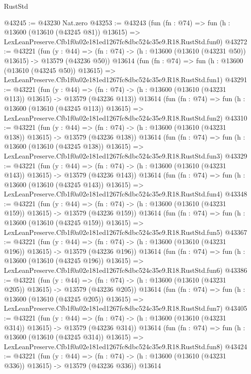 \begin{lexlean}{RustStd}
\begin{coremodule}
@43245 := @43230 Nat.zero
@43253 := @43243
    (fun (fn : @74) =>
    fun (h : @13600 (@13610 (@43245 @81)) @13615) =>
    LexLeanPreserve.Cfb1f0a02e181ed1267fc8dbc524c35e9.R18.RustStd.fun0)
@43272 := @43221
    (fun (y : @44) =>
    (fn : @74) -> (h : @13600 (@13610 (@43231 @50)) @13615) -> @13579 (@43236 @50))
    @13614
    (fun (fn : @74) =>
    fun (h : @13600 (@13610 (@43245 @50)) @13615) =>
    LexLeanPreserve.Cfb1f0a02e181ed1267fc8dbc524c35e9.R18.RustStd.fun1)
@43291 := @43221
    (fun (y : @44) =>
    (fn : @74) -> (h : @13600 (@13610 (@43231 @113)) @13615) -> @13579 (@43236 @113))
    @13614
    (fun (fn : @74) =>
    fun (h : @13600 (@13610 (@43245 @113)) @13615) =>
    LexLeanPreserve.Cfb1f0a02e181ed1267fc8dbc524c35e9.R18.RustStd.fun2)
@43310 := @43221
    (fun (y : @44) =>
    (fn : @74) -> (h : @13600 (@13610 (@43231 @138)) @13615) -> @13579 (@43236 @138))
    @13614
    (fun (fn : @74) =>
    fun (h : @13600 (@13610 (@43245 @138)) @13615) =>
    LexLeanPreserve.Cfb1f0a02e181ed1267fc8dbc524c35e9.R18.RustStd.fun3)
@43329 := @43221
    (fun (y : @44) =>
    (fn : @74) -> (h : @13600 (@13610 (@43231 @143)) @13615) -> @13579 (@43236 @143))
    @13614
    (fun (fn : @74) =>
    fun (h : @13600 (@13610 (@43245 @143)) @13615) =>
    LexLeanPreserve.Cfb1f0a02e181ed1267fc8dbc524c35e9.R18.RustStd.fun4)
@43348 := @43221
    (fun (y : @44) =>
    (fn : @74) -> (h : @13600 (@13610 (@43231 @159)) @13615) -> @13579 (@43236 @159))
    @13614
    (fun (fn : @74) =>
    fun (h : @13600 (@13610 (@43245 @159)) @13615) =>
    LexLeanPreserve.Cfb1f0a02e181ed1267fc8dbc524c35e9.R18.RustStd.fun5)
@43367 := @43221
    (fun (y : @44) =>
    (fn : @74) -> (h : @13600 (@13610 (@43231 @196)) @13615) -> @13579 (@43236 @196))
    @13614
    (fun (fn : @74) =>
    fun (h : @13600 (@13610 (@43245 @196)) @13615) =>
    LexLeanPreserve.Cfb1f0a02e181ed1267fc8dbc524c35e9.R18.RustStd.fun6)
@43386 := @43221
    (fun (y : @44) =>
    (fn : @74) -> (h : @13600 (@13610 (@43231 @205)) @13615) -> @13579 (@43236 @205))
    @13614
    (fun (fn : @74) =>
    fun (h : @13600 (@13610 (@43245 @205)) @13615) =>
    LexLeanPreserve.Cfb1f0a02e181ed1267fc8dbc524c35e9.R18.RustStd.fun7)
@43405 := @43221
    (fun (y : @44) =>
    (fn : @74) -> (h : @13600 (@13610 (@43231 @314)) @13615) -> @13579 (@43236 @314))
    @13614
    (fun (fn : @74) =>
    fun (h : @13600 (@13610 (@43245 @314)) @13615) =>
    LexLeanPreserve.Cfb1f0a02e181ed1267fc8dbc524c35e9.R18.RustStd.fun8)
@43424 := @43221
    (fun (y : @44) =>
    (fn : @74) -> (h : @13600 (@13610 (@43231 @336)) @13615) -> @13579 (@43236 @336))
    @13614

\end{coremodule}
\end{lexlean}
